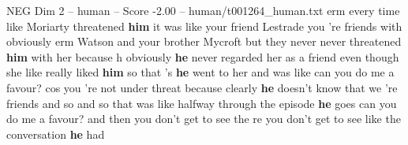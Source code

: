 \begin{textsample}{NEG Dim 2 – human – Score -2.00 – human/t001264\_human.txt}  \label{ex:f2_neg_013}
erm every time like Moriarty threatened \textbf{him} it was like your friend Lestrade you 're friends with obviously erm Watson and your brother Mycroft but they never never threatened \textbf{him} with her because h obviously \textbf{he} never regarded her as a friend even though she like really liked \textbf{him} so that 's \textbf{he} went to her and was like can you do me a favour? cos you 're not under threat because clearly \textbf{he} doesn't know that we 're friends and so and so that was like halfway through the episode \textbf{he} goes can you do me a favour? and then you don't get to see the re you don't get to see like the conversation \textbf{he} had

\end{textsample}
